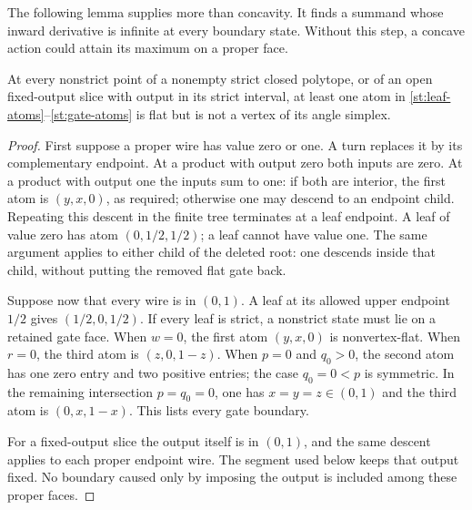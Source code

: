 The following lemma supplies more than concavity. It finds a summand
whose inward derivative is infinite at every boundary state. Without
this step, a concave action could attain its maximum on a proper face.
\begin{lemma}\label{st:barrier}
At every nonstrict point of a nonempty strict closed
polytope, or of an open fixed-output slice with output
in its strict interval, at least one atom in
\eqref{st:leaf-atoms}--\eqref{st:gate-atoms} is flat
but is not a vertex of its angle simplex.
\end{lemma}
\begin{proof}
First suppose a proper wire has value zero or one.
A turn replaces it by its complementary endpoint.
At a product with output zero both inputs are zero.
At a product with output one the inputs sum to one:
if both are interior, the first atom is $(y,x,0)$,
as required; otherwise one may descend to an endpoint
child. Repeating this descent in the finite tree
terminates at a leaf endpoint. A leaf of value zero
has atom $(0,1/2,1/2)$; a leaf cannot have value one.
The same argument applies to either child of the
deleted root: one descends inside that child, without
putting the removed flat gate back.

Suppose now that every wire is in $(0,1)$.
A leaf at its allowed upper endpoint $1/2$ gives
$(1/2,0,1/2)$. If every leaf is strict, a nonstrict
state must lie on a retained gate face.
When $w=0$, the first atom $(y,x,0)$ is nonvertex-flat.
When $r=0$, the third atom is $(z,0,1-z)$.
When $p=0$ and $q_0>0$, the second atom has one zero
entry and two positive entries; the case $q_0=0<p$
is symmetric. In the remaining intersection
$p=q_0=0$, one has $x=y=z\in(0,1)$ and the third
atom is $(0,x,1-x)$. This lists every gate boundary.

For a fixed-output slice the output itself is in
$(0,1)$, and the same descent applies to each proper
endpoint wire. The segment used below keeps that
output fixed. No boundary caused only by imposing
the output is included among these proper faces.
\end{proof}

